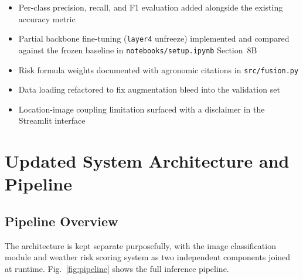 \documentclass[conference]{IEEEtran}
\let\oldtexttt\texttt
\renewcommand{\texttt}[1]{{\small\oldtexttt{#1}}}
\begin{document}
\begin{itemize}
  \item Per-class precision, recall, and F1 evaluation added alongside the existing accuracy metric
  \item Partial backbone fine-tuning (\texttt{layer4} unfreeze) implemented and compared against the frozen baseline in \texttt{notebooks/setup.ipynb} Section~8B
  \item Risk formula weights documented with agronomic citations in \texttt{src/fusion.py}
  \item Data loading refactored to fix augmentation bleed into the validation set
  \item Location-image coupling limitation surfaced with a disclaimer in the Streamlit interface
\end{itemize}

\section{Updated System Architecture and Pipeline}

\subsection{Pipeline Overview}

The architecture is kept separate purposefully, with the image classification module and weather risk scoring system as two independent components joined at runtime. Fig.~\ref{fig:pipeline} shows the full inference pipeline.
\end{document}
